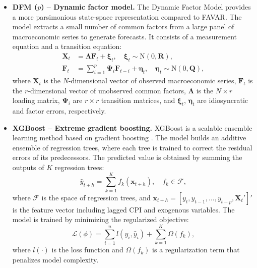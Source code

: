 \documentclass[12pt]{article}
\begin{document}
\begin{itemize}
      \item \textbf{DFM ($p$) -- Dynamic factor model.} The Dynamic Factor Model \citep{stock2002macroeconomic, stock2002forecasting} provides a more parsimonious state-space representation compared to FAVAR. The model extracts a small number of common factors from a large panel of macroeconomic series to generate forecasts. It consists of a measurement equation and a transition equation:
      \begin{align}
      \mathbf{X}_t &= \boldsymbol{\Lambda}\mathbf{F}_t + \boldsymbol{\xi}_t, \quad \boldsymbol{\xi}_t \sim \text{N}(0, \mathbf{R}), \\
      \mathbf{F}_t &= \sum_{i=1}^{p} \boldsymbol{\Psi}_i\mathbf{F}_{t-i} + \boldsymbol{\eta}_t, \quad \boldsymbol{\eta}_t \sim \text{N}(0, \mathbf{Q}),
      \end{align}
      where $\mathbf{X}_t$ is the $N$-dimensional vector of observed macroeconomic series, $\mathbf{F}_t$ is the $r$-dimensional vector of unobserved common factors, $\boldsymbol{\Lambda}$ is the $N \times r$ loading matrix, $\boldsymbol{\Psi}_i$ are $r \times r$ transition matrices, and $\boldsymbol{\xi}_t$, $\boldsymbol{\eta}_t$ are idiosyncratic and factor errors, respectively.

      \item \textbf{XGBoost -- Extreme gradient boosting.} XGBoost is a scalable ensemble learning method based on gradient boosting \citep{chen2016xgboost}. The model builds an additive ensemble of regression trees, where each tree is trained to correct the residual errors of its predecessors. The predicted value is obtained by summing the outputs of $K$ regression trees:
      \begin{equation}
      \hat{y}_{t+h} = \sum_{k=1}^{K} f_k(\mathbf{x}_{t+h}), \quad f_k \in \mathcal{F},
      \end{equation}
      where $\mathcal{F}$ is the space of regression trees, and $\mathbf{x}_{t+h} = [y_t, y_{t-1}, \dots, y_{t-p}, \mathbf{X}_t']'$ is the feature vector including lagged CPI and exogenous variables. The model is trained by minimizing the regularized objective:
      \begin{equation}
      \mathcal{L}(\phi) = \sum_{i=1}^{n} l(y_i, \hat{y}_i) + \sum_{k=1}^{K} \Omega(f_k),
      \end{equation}
      where $l(\cdot)$ is the loss function and $\Omega(f_k)$ is a regularization term that penalizes model complexity.


\end{itemize}
\end{document}
